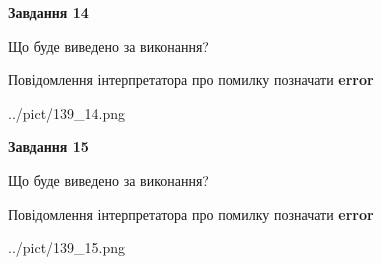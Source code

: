 \documentclass[11pt, ukrainian]{article}
\begin{document}
{\begin {large}
{\begin {center}\textbf{Завдання 14}\end {center}}\par
Що буде виведено за виконання? \par
Повідомлення інтерпретатора про помилку позначати \textbf{error}

\begin{center}
	{../pict/139_14.png}
\end{center}
\newpage

{\begin {center}\textbf{Завдання 15}\end {center}}\par
Що буде виведено за виконання? \par
Повідомлення інтерпретатора про помилку позначати \textbf{error}

\begin{center}
	{../pict/139_15.png}
\end{center}
\newpage

\end {large}}
\end{document}
